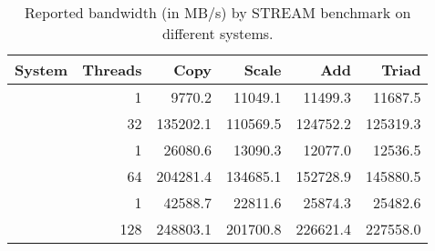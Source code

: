 \begin{table}
	\centering
	\caption{Reported bandwidth (in MB/s) by STREAM benchmark on different systems.}
	\label{tab:stream}
	\begin{tabular}{lrrrrr}
		\toprule
		System                       & Threads & Copy     & Scale    & Add      & Triad    \\
		\midrule
		\multirow{2}{*}{\machhydra}  & 1       & 9770.2   & 11049.1  & 11499.3  & 11687.5  \\
		                             & 32      & 135202.1 & 110569.5 & 124752.2 & 125319.3 \\
		\midrule
		\multirow{2}{*}{\machnebula} & 1       & 26080.6  & 13090.3  & 12077.0  & 12536.5  \\
		                             & 64      & 204281.4 & 134685.1 & 152728.9 & 145880.5 \\
		\midrule
		\multirow{2}{*}{\machvsc}    & 1       & 42588.7  & 22811.6  & 25874.3  & 25482.6  \\
		                             & 128     & 248803.1 & 201700.8 & 226621.4 & 227558.0 \\
		\bottomrule
	\end{tabular}
\end{table}



